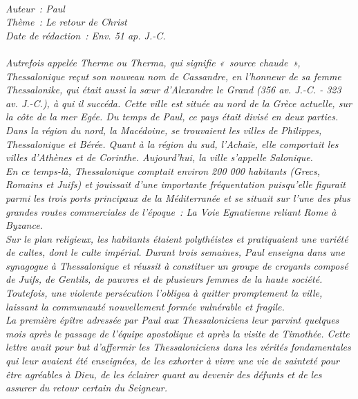 \BFont
\noindent\hrulefill
{\footnotesize
\textit{
\bigskip
{\centering{}
\\Auteur~: Paul
\\Thème~: Le retour de Christ
\\Date de rédaction~: Env. 51 ap. J.-C.\\}
}
\textit{
\\Autrefois appelée Therme ou Therma, qui signifie «~source chaude~», Thessalonique reçut son nouveau nom de Cassandre, en l'honneur de sa femme Thessalonike, qui était aussi la sœur d'Alexandre le Grand (356 av. J.-C. - 323 av. J.-C.), à qui il succéda. Cette ville est située au nord de la Grèce actuelle, sur la côte de la mer Egée. Du temps de Paul, ce pays était divisé en deux parties. Dans la région du nord, la Macédoine, se trouvaient les villes de Philippes, Thessalonique et Bérée. Quant à la région du sud, l'Achaïe, elle comportait les villes d'Athènes et de Corinthe. Aujourd'hui, la ville s'appelle Salonique.
\\En ce temps-là, Thessalonique comptait environ 200 000 habitants (Grecs, Romains et Juifs) et jouissait d'une importante fréquentation puisqu'elle figurait parmi les trois ports principaux de la Méditerranée et se situait sur l'une des plus grandes routes commerciales de l'époque~: La Voie Egnatienne reliant Rome à Byzance.
\\Sur le plan religieux, les habitants étaient polythéistes et pratiquaient une variété de cultes, dont le culte impérial. Durant trois semaines, Paul enseigna dans une synagogue à Thessalonique et réussit à constituer un groupe de croyants composé de Juifs, de Gentils, de pauvres et de plusieurs femmes de la haute société. Toutefois, une violente persécution l'obligea à quitter promptement la ville, laissant la communauté nouvellement formée vulnérable et fragile.
\\La première épître adressée par Paul aux Thessaloniciens leur parvint quelques mois après le passage de l'équipe apostolique et après la visite de Timothée. Cette lettre avait pour but d'affermir les Thessaloniciens dans les vérités fondamentales qui leur avaient été enseignées, de les exhorter à vivre une vie de sainteté pour être agréables à Dieu, de les éclairer quant au devenir des défunts et de les assurer du retour certain du Seigneur.\bigskip
}
}
\par\nobreak\noindent\hrulefill
